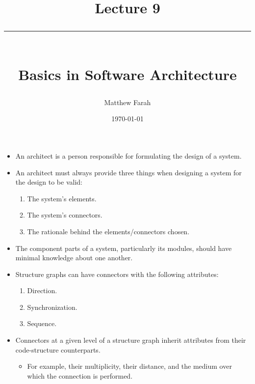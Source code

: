 \documentclass{article}
\date{
	\vspace{-.75em}
	{\large \today}
}
\title{
	\vspace*{-1.5em}
	{\Huge Lecture 9} \\
	\vspace{-1em}
	\rule{\textwidth/4}{.01em} \\
	\vspace{-.25em}
	{\Large Basics in Software Architecture}
	\vspace{-.75em}
}
\author{
	{\large Matthew Farah}
}
\begin{document}
\maketitle
\pagestyle{fancy}

\fi

\begin{itemize}
	\item An architect is a person responsible for formulating the design of a system.
	\item An architect must always provide three things when designing a system for the design to be valid:
	\begin{enumerate}
		\item The system's elements.
		\item The system's connectors.
		\item The rationale behind the elements/connectors chosen.
	\end{enumerate}
	\item The component parts of a system, particularly its modules, should have minimal knowledge about one another.
	\item Structure graphs can have connectors with the following attributes:
	\begin{enumerate}
		\item Direction.
		\item Synchronization.
		\item Sequence.
	\end{enumerate}
	\item Connectors at a given level of a structure graph inherit attributes from their code-structure counterparts.
	\begin{itemize}
		\item For example, their multiplicity, their distance, and the medium over which the connection is performed.
	\end{itemize}
\end{itemize}

\ifdefined\iscombined
	\newpage
\else
	
\end{document}
